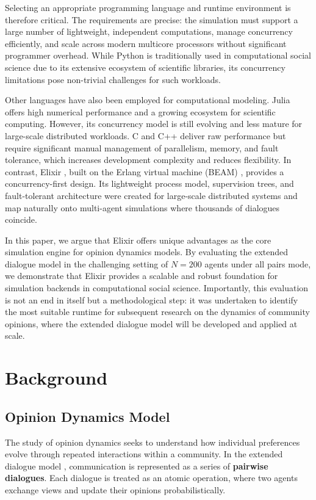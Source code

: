 \documentclass[
]{ceurart}
\begin{document}
Selecting an appropriate programming language and runtime environment is therefore critical. The requirements are precise: the simulation must support a large number of lightweight, independent computations, manage concurrency efficiently, and scale across modern multicore processors without significant programmer overhead. While Python is traditionally used in computational social science due to its extensive ecosystem of scientific libraries, its concurrency limitations pose non-trivial challenges for such workloads.

Other languages have also been employed for computational modeling. Julia \cite{Julia2025} offers high numerical performance and a growing ecosystem for scientific computing. However, its concurrency model is still evolving and less mature for large-scale distributed workloads. C and C++ deliver raw performance but require significant manual management of parallelism, memory, and fault tolerance, which increases development complexity and reduces flexibility. In contrast, Elixir \cite{Elixir2025}, built on the Erlang virtual machine (BEAM) \cite{Erlang2025}, provides a concurrency-first design. Its lightweight process model, supervision trees, and fault-tolerant architecture were created for large-scale distributed systems and map naturally onto multi-agent simulations where thousands of dialogues coincide.

In this paper, we argue that Elixir offers unique advantages as the core simulation engine for opinion dynamics models. By evaluating the extended dialogue model in the challenging setting of $N = 200$ agents under all pairs mode, we demonstrate that Elixir provides a scalable and robust foundation for simulation backends in computational social science. Importantly, this evaluation is not an end in itself but a methodological step: it was undertaken to identify the most suitable runtime for subsequent research on the dynamics of community opinions, where the extended dialogue model will be developed and applied at scale.

\section{Background}
\label{sec:background}
\subsection{Opinion Dynamics Model}
The study of opinion dynamics seeks to understand how individual preferences evolve through repeated interactions within a community. In the extended dialogue model \cite{Lytvynenko2025}, communication is represented as a series of \textbf{pairwise dialogues}. Each dialogue is treated as an atomic operation, where two agents exchange views and update their opinions probabilistically.
\end{document}
